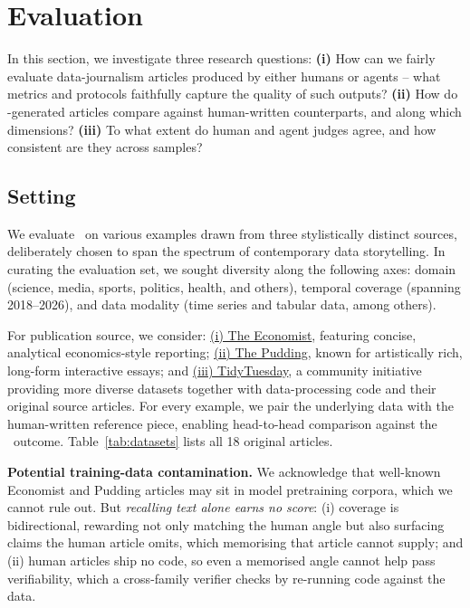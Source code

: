 \section{Evaluation}
\label{sec:eval}
In this section, we investigate three research questions:
\textbf{(i)} How can we fairly evaluate data-journalism articles produced by either humans or agents -- what metrics and protocols faithfully capture the quality of such outputs?
\textbf{(ii)} How do \methodshort-generated articles compare against human-written counterparts, and along which dimensions?
\textbf{(iii)} To what extent do human and agent judges agree, and how consistent are they across samples?

\subsection{Setting}
\label{sec:setting}



We evaluate \methodshort\ on various  examples drawn from three stylistically distinct sources, deliberately chosen to span the spectrum of contemporary data storytelling. In curating the evaluation set, we sought diversity along the following axes: domain (science, media, sports, politics, health, and others), temporal coverage (spanning 2018–2026), and data modality (time series and tabular data, among others). 

For publication source, we consider: 
\href{https://www.economist.com/graphic-detail}{(i) The Economist}, featuring concise, analytical economics-style reporting; 
\href{https://pudding.cool/}{(ii) The Pudding}, known for artistically rich, long-form interactive essays; 
and \href{https://github.com/rfordatascience/tidytuesday}{(iii) TidyTuesday}, a community initiative providing more diverse datasets together with data-processing code and their original source articles. 
For every example, we pair the underlying data with the human-written reference piece, enabling head-to-head comparison against the \method\ outcome. 
Table~\ref{tab:datasets} lists all 18 original articles. 

\textbf{Potential training-data contamination.} 
We acknowledge that well-known Economist and Pudding articles may sit in model pretraining corpora, which we cannot rule out. 
But \textit{recalling text alone earns no score}: 
(i) coverage is bidirectional, rewarding not only matching the human angle but also surfacing claims the human article omits, which memorising that article cannot supply;
and (ii) human articles ship no code, so even a memorised angle cannot help pass verifiability, which a cross-family verifier checks by re-running code against the data.

